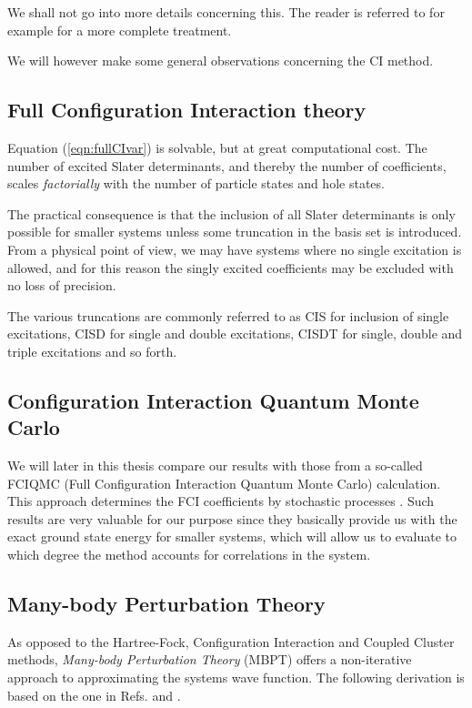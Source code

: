 We shall not go into more details concerning this. The reader is
referred to for example \cite[p.177]{Harris} for a more complete
treatment.

We will however make some general observations concerning the CI method. 

\subsection{Full Configuration Interaction theory}

Equation (\ref{eqn:fullCIvar}) is solvable, but at great
computational cost. The number of excited Slater determinants, and
thereby the number of coefficients, scales \emph{factorially} with the
number of particle states and hole states.

The practical consequence is that the inclusion of all Slater
determinants is only possible for smaller systems unless some
truncation in the basis set is introduced. From a physical
point of view, we may have systems where no single excitation is
allowed, and for this reason the singly excited coefficients may be
excluded with no loss of precision.

The various truncations are commonly referred to as CIS for inclusion
of single excitations, CISD for single and double excitations, CISDT
for single, double and triple excitations and so forth.

\subsection{Configuration Interaction Quantum Monte Carlo}

We will later in this thesis compare our results with those from a
so-called FCIQMC (Full Configuration Interaction Quantum Monte Carlo)
calculation. This approach determines the FCI coefficients by
stochastic processes \cite{Booth2013,Leikanger2013}. Such
results are very valuable for our purpose since they basically provide us
with the exact ground state energy for smaller systems, which will
allow us to evaluate to which degree the method accounts for
correlations in the system.

\subsection{Many-body Perturbation Theory}

As opposed to the Hartree-Fock, Configuration Interaction and
Coupled Cluster methods, \emph{Many-body Perturbation Theory} (MBPT)
offers a non-iterative approach to approximating the systems wave
function. The following derivation is based on the one in Refs.
\cite{ShavittBartlett2009} and \cite{hh4480}.

